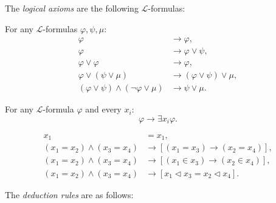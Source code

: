 The \textit{logical axioms} are the following $\mathcal{L}$-formulas:

\begin{definition}
    \label{def:Bool.Axioms}
    \leanok
    For any $\mathcal{L}$-formulas $\varphi, \psi, \mu$:
    $$
    \begin{aligned}
    \varphi & \rightarrow \varphi, \\
    \varphi & \rightarrow \varphi \lor \psi, \\
    \varphi \lor \varphi & \rightarrow \varphi, \\
    \varphi \lor(\psi \lor \mu) & \rightarrow(\varphi \lor \psi) \lor \mu, \\
    (\varphi \lor \psi) \land(\neg \varphi \lor \mu) & \rightarrow \psi \lor \mu .
    \end{aligned}
    $$
\end{definition}

\begin{definition}
    \label{def:Spec.Axiom}
    \leanok
    For any $\mathcal{L}$-formula $\varphi$ and every $x_i$:
    $$\varphi \rightarrow \exists x_i \varphi.$$
\end{definition}

\begin{definition}
    \label{def:Equality.Axioms}
    \leanok
    $$
    \begin{aligned}
        x_1 & = x_1, \\
        \left(x_1=x_2\right) \land \left(x_3=x_4\right) & 
        \rightarrow \left[\left(x_1=x_3\right) \rightarrow \left(x_2=x_4\right)\right], \\
        \left(x_1=x_2\right) \land \left(x_3=x_4\right) & 
        \rightarrow \left[\left(x_1 \in x_3\right) \rightarrow \left(x_2 \in x_4\right)\right], \\
        \left(x_1=x_2\right) \land \left(x_3=x_4\right) & 
        \rightarrow \left[x_1 \lhd x_3 = x_2 \lhd x_4 \right]. 
    \end{aligned}
    $$
\end{definition}

The \textit{deduction rules} are as follows:

